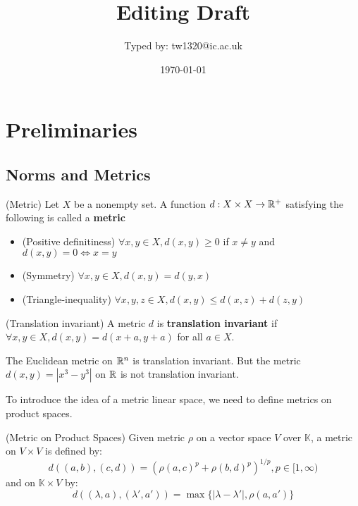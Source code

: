 \documentclass{article}
\title{Editing Draft}
\author{Typed by: tw1320@ic.ac.uk}
\date{\today}
\begin{document}
\maketitle

\section{Preliminaries}   

\subsection{Norms and Metrics}

\begin{defn}
(Metric) Let $X$ be a nonempty set. 
A function $d: X \times X \to \mathbb{R}^+$ satisfying the following is called a  \textbf{metric}  

\begin{itemize}
    \item (Positive definitiness) $\forall x,y \in X, d(x,y)\geq 0$ if $x \neq y$ and $d(x,y)=0 \iff x=y$
    \item (Symmetry) $\forall x,y \in X, d(x,y)=d(y,x)$
    \item (Triangle-inequality) $\forall x,y,z \in X, d(x,y) \leq d(x,z) + d(z,y)$
\end{itemize}

\end{defn}
\begin{defn}
    (Translation invariant) A metric $d$ is \textbf{translation invariant} if $\forall x,y \in X, d(x,y)=d(x+a,y+a)$ for all $a \in X$.
\end{defn} 

\begin{eg}
    The Euclidean metric on $\mathbb{R}^n$ is translation invariant.  
    But the metric $d(x,y)=|x^3-y^3|$ on $\mathbb{R}$ is not translation invariant.
\end{eg}

To introduce the idea of a metric linear space, we need to define metrics on product spaces.  

\begin{defn} (Metric on Product Spaces)
    Given metric $\rho$ on a vector space $V$ over $\mathbb{K}$, a metric on $V \times V$ is defined by:  
    \begin{equation*}
        d((a,b),(c,d)) = (\rho(a,c)^p+\rho(b,d)^p)^{1/p}, p \in [1,\infty)
    \end{equation*}  
    and on $\mathbb{K} \times V$ by:
    \begin{equation*}
        d((\lambda, a),(\lambda',a')) = \max \{|\lambda-\lambda'|, \rho (a, a')\}
    \end{equation*}
\end{defn}
\end{document}
